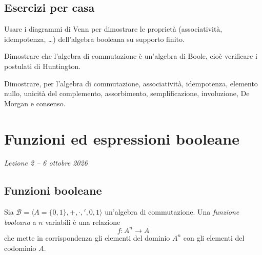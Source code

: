 \documentclass[11pt,a4paper]{article}
\begin{document}
\subsection*{Esercizi per casa}

\begin{esercizio}
Usare i diagrammi di Venn per dimostrare le proprietà (associatività,
idempotenza, \dots) dell'algebra booleana su supporto finito.
\end{esercizio}
\begin{esercizio}
Dimostrare che l'algebra di commutazione è un'algebra di Boole, cioè verificare
i postulati di Huntington.
\end{esercizio}
\begin{esercizio}
Dimostrare, per l'algebra di commutazione, associatività, idempotenza, elemento
nullo, unicità del complemento, assorbimento, semplificazione, involuzione, De
Morgan e consenso.
\end{esercizio}

\section[Funzioni ed espressioni booleane (Lezione 2 -- 6 ottobre 2026)]{Funzioni ed espressioni booleane}
\noindent\emph{Lezione 2 -- 6 ottobre 2026}
\subsection{Funzioni booleane}

\begin{definizione}
Sia $\mathcal{B} = \langle A = \{0,1\}, +, \cdot, ', 0, 1 \rangle$ un'algebra di
commutazione. Una \emph{funzione booleana} a $n$ variabili è una relazione
\[
  f \colon A^n \to A
\]
che mette in corrispondenza gli elementi del dominio $A^n$ con gli elementi del
codominio $A$.
\end{definizione}
\end{document}
